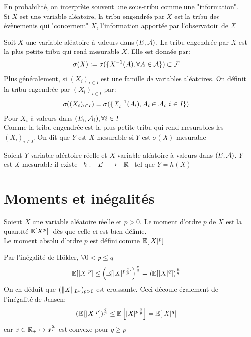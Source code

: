 \documentclass[]{report}
\begin{document}
    En probabilité, on interprète souvent une sous-tribu comme une "information".\\
    Si $X$ est une variable aléatoire, la tribu engendrée par $X$ est la tribu des évènements qui "concernent" $X$, l'information apportée par l'observatoin de $X$
    
    \begin{df}{}{}
        Soit $X$ une variable aléatoire à valeurs dans $(E,\mathcal{A})$. La tribu engendrée par $X$ est la plus petite tribu qui rend mesurable $X$. Elle est donnée par:
        \[\sigma(X):=\sigma(\{X^{-1}(A),\forall A\in \mathcal{A}\})\subset \mathcal{F}\]
        Plus généralement, si $(X_i)_{i\in I}$ est une famille de variables aléatoires. On définit la tribu engendrée par $(X_i)_{i\in I}$ par:
        \[\sigma((X_i)_{i\in I})=\sigma(\{X_i^{-1}(A_i),A_i\in\mathcal{A}_i,i\in I\})\]
        Pour $X_i$ à valeurs dans $(E_i,\mathcal{A}_i),\forall i\in I$\\
        Comme la tribu engendrée est la plus petite tribu qui rend mesurables les $(X_i)_{i\in I}$. On dit que $Y$ est $X$-mesurable si $Y$ est $\sigma(X)$-mesurable
    \end{df}

    \begin{prop}{}{}
        Soient $Y$ variable aléatoire réelle et $X$ variable aléatoire à valeurs dans $(E,\mathcal{A})$. $Y$ est $X$-mesurable \ssi il existe $\begin{array}{ccccc} h : & E & \to & \mathbb{R} \end{array}$ tel que $Y=h(X)$
    \end{prop}

    \section{Moments et inégalités}

    \begin{df}{}{}
        Soient $X$ une variable aléatoire réelle et $p>0$. Le moment d'ordre $p$ de $X$ est la quantité $\mathbb{E} [X^p]$, dès que celle-ci est bien définie.\\
        Le moment absolu d'ordre $p$ est défini comme $\mathbb{E}[|X|^p]$ 
    \end{df}

    \begin{prop}{}{}
        Par l'inégalité de Hölder, $\forall 0<p\le q$
        \[\mathbb{E} [|X|^p]\le \left(\mathbb{E}[|X|^{p\frac{q}{p}}]\right)^\frac{p}{q}=\left(\mathbb{E}[|X|^q]\right)^\frac{p}{q}\]
        On en déduit que $(\lVert X \rVert_{L^p})_{p>0}$ est croissante. Ceci découle également de l'inégalité de Jensen:
        \[\left(\mathbb{E}\left[|X|^p\right]\right)^{\frac{q}{p}}\le\mathbb{E}\left[{|X|^p}^{\frac{q}{p}}\right]=\mathbb{E}[|X|^q]\]
        car $x\in \mathbb{R}_+\mapsto x^\frac{q}{p}$ est convexe pour $q\ge p$
    \end{prop}
\end{document}
